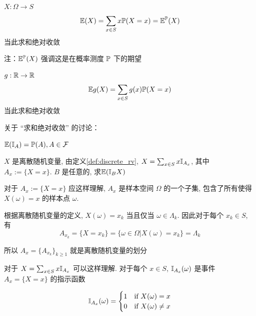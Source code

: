 \begin{definition}[$X$的期望]\label{def:E(x)}
    $X:\Omega\rightarrow S$
    \[
    \mathbb E(X)=\sum_{x\in S}x\mathbb{P}(X=x)=\mathbb E^{\mathbb{P}}(X)
    \]
    当此求和绝对收敛

    注：$\mathbb E^{\mathbb{P}}(X)$ 强调这是在概率测度 $\mathbb{P}$ 下的期望
\end{definition}

\begin{definition}[$g(X)$的期望]
    $g:\mathbb{R}\rightarrow \mathbb{R}$
    \[
    \mathbb E g(X)=\sum_{x\in S}g(x)\mathbb{P}(X=x)
    \]
    当此求和绝对收敛
\end{definition}

关于 “求和绝对收敛” 的讨论：

\begin{example}\label{exa:expec2prob}
    $\mathbb E(\mathbb I_A)=\mathbb{P}(A), A\in \mathcal{F}$
\end{example}

\begin{example}\label{exa:expec_of_indica}
    $X$ 是离散随机变量, 由定义\ref{def:discrete_rv}, $X=\sum_{x\in S}x\mathbb I_{A_x}$, 其中 $A_x:=\{X=x\}$. $B$ 是任意的, 求$\mathbb E(\mathbb I_B X)$
\end{example}

\begin{remark}
对于 $A_x:=\{X=x\}$ 应这样理解, $A_x$ 是样本空间 $\Omega$ 的一个子集, 包含了所有使得 $X(\omega)=x$ 的样本点 $\omega$. 

根据离散随机变量的定义, $X(\omega)=x_k$ 当且仅当 $\omega\in \Lambda_k$. 因此对于每个 $x_k\in S$, 有
\[
A_{x_k}=\{X=x_k\}=\{\omega\in \Omega|X(\omega)=x_k\}=\Lambda_k
\]

所以 $A_x=\{A_{x_k}\}_{k\geq 1}$ 就是离散随机变量的划分

对于 $X=\sum_{x\in S}x\mathbb I_{A_x}$ 可以这样理解. 对于每个 $x\in S$, $\mathbb I_{A_x}(\omega)$ 是事件 $A_x=\{X=x\}$ 的指示函数

\[
    \mathbb I_{A_x}(\omega)=\begin{cases}
        1 & \text{if } X(\omega)=x\\
        0 & \text{if } X(\omega)\neq x
    \end{cases}
\]
\end{remark}

